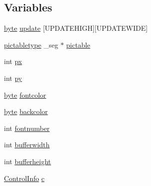 \subsection*{Variables}
\begin{DoxyCompactItemize}
\item 
\hyperlink{ID__HEAD_8H_a0c8186d9b9b7880309c27230bbb5e69d}{byte} \hyperlink{ID__VH_8C_afbdf4a0314978cdee83ec9193c21bba9}{update} \mbox{[}UPDATEHIGH\mbox{]}\mbox{[}UPDATEWIDE\mbox{]}
\item 
\hyperlink{structpictabletype}{pictabletype} \_\-seg $\ast$ \hyperlink{ID__VH_8C_a1ba97b4fa7a2259ee911a1154eda1dc9}{pictable}
\item 
int \hyperlink{ID__VH_8C_a6bbc6b7e52b17450c52d8e748d6abae1}{px}
\item 
int \hyperlink{ID__VH_8C_aa9511a47fd6271333948489a220e3029}{py}
\item 
\hyperlink{ID__HEAD_8H_a0c8186d9b9b7880309c27230bbb5e69d}{byte} \hyperlink{ID__VH_8C_a37dfad01117cac8636922fd4d030131b}{fontcolor}
\item 
\hyperlink{ID__HEAD_8H_a0c8186d9b9b7880309c27230bbb5e69d}{byte} \hyperlink{ID__VH_8C_ae05eaca54ea12a430673a8732425a748}{backcolor}
\item 
int \hyperlink{ID__VH_8C_a4837949d7c7b2ed1e3f5874b69986fd8}{fontnumber}
\item 
int \hyperlink{ID__VH_8C_ab8fea1ae304ccc29629c3c2d051364a4}{bufferwidth}
\item 
int \hyperlink{ID__VH_8C_a03f2ca98b50de17e5b84834cdac38ff1}{bufferheight}
\item 
\hyperlink{structCursorInfo}{ControlInfo} \hyperlink{ID__VH_8C_a6a23f31bb58d6a932349aa926c720e47}{c}
\end{DoxyCompactItemize}


